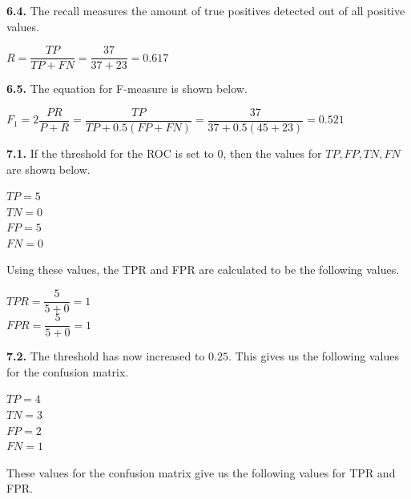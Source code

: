 \documentclass[12pt]{article}
\begin{document}
{\bf 6.4.} The recall measures the amount of true positives detected out of all positive values.

\begin{center}

$R=\dfrac{TP}{TP+FN}=\dfrac{37}{37+23}=0.617$\\

\end{center}

{\bf 6.5.} The equation for F-measure is shown below.

\begin{center}

$F_{1}=2\dfrac{PR}{P+R}=\dfrac{TP}{TP+0.5(FP+FN)}=\dfrac{37}{37+0.5(45+23)}=0.521$\\

\end{center}

{\bf 7.1.} If the threshold for the ROC is set to 0, then the values for $TP, FP, TN, FN$ are shown below.

\begin{center}

$TP=5$\\
$TN=0$\\
$FP=5$\\
$FN=0$\\

\end{center}

Using these values, the TPR and FPR are calculated to be the following values.

\begin{center}

$TPR=\dfrac{5}{5+0}=1$\\
\bigskip
$FPR=\dfrac{5}{5+0}=1$\\

\end{center}

{\bf 7.2.} The threshold has now increased to $0.25$. This gives us the following values for the confusion matrix.

\begin{center}

$TP=4$\\
$TN=3$\\
$FP=2$\\
$FN=1$\\

\end{center}

These values for the confusion matrix give us the following values for TPR and FPR.
\end{document}

